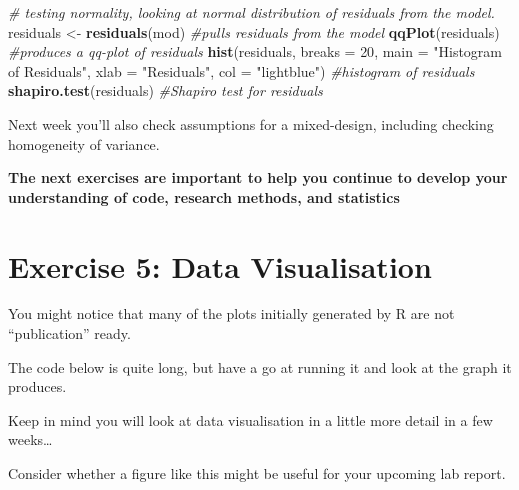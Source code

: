 \documentclass[
]{book}
\newenvironment{Shaded}{\begin{snugshade}}{\end{snugshade}}
\newcommand{\AttributeTok}[1]{\textcolor[rgb]{0.13,0.29,0.53}{#1}}
\newcommand{\CommentTok}[1]{\textcolor[rgb]{0.56,0.35,0.01}{\textit{#1}}}
\newcommand{\DecValTok}[1]{\textcolor[rgb]{0.00,0.00,0.81}{#1}}
\newcommand{\FunctionTok}[1]{\textcolor[rgb]{0.13,0.29,0.53}{\textbf{#1}}}
\newcommand{\NormalTok}[1]{#1}
\newcommand{\OtherTok}[1]{\textcolor[rgb]{0.56,0.35,0.01}{#1}}
\newcommand{\StringTok}[1]{\textcolor[rgb]{0.31,0.60,0.02}{#1}}
\let\oldsection\section
\renewcommand{\section}{\needspace{5\baselineskip}\oldsection}
\begin{document}
\begin{Shaded}
\begin{Highlighting}[]
\CommentTok{\# testing normality, looking at normal distribution of residuals from the model.}
\NormalTok{residuals }\OtherTok{\textless{}{-}} \FunctionTok{residuals}\NormalTok{(mod) }\CommentTok{\#pulls residuals from the model}
\FunctionTok{qqPlot}\NormalTok{(residuals) }\CommentTok{\#produces a qq{-}plot of residuals}
\FunctionTok{hist}\NormalTok{(residuals, }\AttributeTok{breaks =} \DecValTok{20}\NormalTok{, }\AttributeTok{main =} \StringTok{"Histogram of Residuals"}\NormalTok{, }\AttributeTok{xlab =} \StringTok{"Residuals"}\NormalTok{, }\AttributeTok{col =} \StringTok{"lightblue"}\NormalTok{) }\CommentTok{\#histogram of residuals}
\FunctionTok{shapiro.test}\NormalTok{(residuals) }\CommentTok{\#Shapiro test for residuals}
\end{Highlighting}
\end{Shaded}

Next week you'll also check assumptions for a mixed-design, including checking homogeneity of variance.

\textbf{The next exercises are important to help you continue to develop your understanding of code, research methods, and statistics}

\section{Exercise 5: Data Visualisation}\label{exercise-5-data-visualisation}

You might notice that many of the plots initially generated by R are not ``publication'' ready.

The code below is quite long, but have a go at running it and look at the graph it produces.

Keep in mind you will look at data visualisation in a little more detail in a few weeks\ldots{}

Consider whether a figure like this might be useful for your upcoming lab report.
\end{document}
